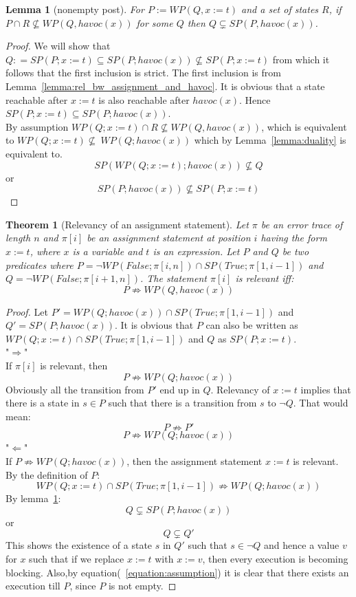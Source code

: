 \documentclass{article}
\newcommand{\limp}{\Rightarrow}
\newcommand{\WP}[2]{\mathit{WP}(#1,#2)}
\newcommand{\SP}[2]{\mathit{SP}(#1,#2)}
\newcommand{\havoc}{\mathit{havoc}}
\newtheorem{theorem}{Theorem}
\newtheorem{lemma}{Lemma}
\begin{document}
\begin{lemma}[nonempty post]\label{lemma:nonempty_post}
	For $P := \WP{Q}{x := t}$ and a set of states $R$, if $ P \cap R \nsubseteq \WP{Q}{\havoc(x)}$ for some $Q$ then $Q \subsetneq \SP{P}{\havoc(x)}$.
\end{lemma}
\begin{proof}
	We will show that $Q : =SP(P; x:=t) \subseteq SP(P;havoc(x)) \not\subseteq SP(P; x:=t)$ from which it follows that the first inclusion is strict.
	The first inclusion is from Lemma~\ref{lemma:rel_bw_assignment_and_havoc}. It is obvious that a state reachable after $x:=t$ is also reachable 
	after $havoc(x)$. Hence $SP(P; x:=t) \subseteq SP(P;havoc(x))$. \\
	By assumption $WP(Q;x:=t) \cap R \not\subseteq \WP{Q}{\havoc(x)}$, which is equivalent to $WP(Q; x:=t) \not \subseteq \ WP(Q; havoc(x))$ which by Lemma~\ref{lemma:duality} is equivalent to.
	$$SP(WP(Q;x:=t); havoc(x)) \not\subseteq Q$$
	or 
	$$SP(P;havoc(x)) \not\subseteq SP(P; x:=t)$$
\end{proof}

\begin{theorem}[Relevancy of an assignment statement]\label{mydef:relevancytheorem}
Let $\pi$ be an error trace of length $n$ and $\pi[i]$ be an assignment statement at position $i$ having the form $x:=t$, where $x$ is a variable and $t$ is an expression. Let $P$ and $Q$ be two predicates where $P = \neg WP(False; \pi[i,n]) \cap SP(True; \pi[1,i-1])$ and $Q =  \neg WP(False; \pi[i+1,n])$. The statement $\pi[i]$ is relevant iff:
 $$P \not \limp WP(Q,havoc(x))$$
\end{theorem}

\begin{proof}
Let $P' = WP(Q;havoc(x)) \cap SP(True; \pi[1,i-1])$ and $Q'=SP(P;havoc(x))$. It is obvious that $P$ can also be written as $WP(Q;x:=t) \cap SP(True; \pi[1,i-1])$ and $Q$ as $SP(P;x:=t)$.\\
"$\Rightarrow$"\\
If $\pi[i]$ is relevant, then\\
$$P \not \limp WP(Q;havoc(x))$$
Obviously all the transition from $P'$ end up in $Q$. Relevancy of $x:=t$ implies that there is a state in $s \in P$ such that there is a transition from $s$ to $\neg Q$. That would mean:
$$P \not \limp P'$$
$$P \not \limp WP(Q;havoc(x))$$
"$\Leftarrow$"\\
If $P \not \limp WP(Q;havoc(x))$, then the assignment statement $x:=t$ is relevant.\\
By the definition of $P$:
\begin{equation}\label{equation:assumption}
WP(Q; x:=t) \cap SP(True; \pi[1,i-1]) \not \limp WP(Q; havoc(x))
\end{equation}
By lemma~\ref{lemma:nonempty_post}:
$$Q \subsetneq SP(P; havoc(x)) $$
or
$$Q \subsetneq Q'$$
This shows the existence of a state $s$ in $Q'$ such that $s\in \neg Q$ and hence a value $v$ for $x$ such that if we replace $x:=t$ with $x:=v$, then every execution is becoming blocking. Also,by equation(~\ref{equation:assumption}) it is clear that there exists an execution till $P$, since $P$ is not empty.


\end{proof}
\end{document}
